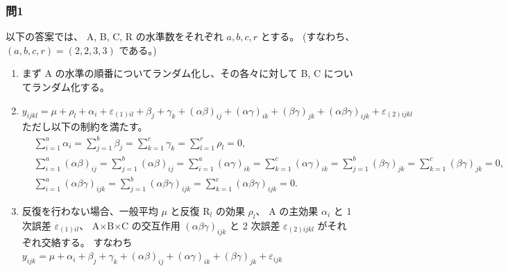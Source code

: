 \documentclass[./main.tex]{subfiles}
\begin{document}
    \subsubsection*{問1}
    以下の答案では、 A, B, C, R の水準数をそれぞれ $a, b, c, r$ とする。
    (すなわち、 $(a, b, c, r) = (2, 2, 3, 3)$ である。)

    \begin{enumerate}
        \item まず A の水準の順番についてランダム化し、その各々に対して B, C についてランダム化する。

        \item $y_{ijkl} = \mu + \rho_l + \alpha_i + \varepsilon_{(1)il}
                + \beta_j + \gamma_k + (\alpha\beta)_{ij} + (\alpha\gamma)_{ik} + (\beta\gamma)_{jk}
                + (\alpha\beta\gamma)_{ijk} + \varepsilon_{(2)ijkl}$\\
        ただし以下の制約を満たす。
        \begin{align*}
            &\sum_{i=1}^a \alpha_i = \sum_{j=1}^b \beta_j = \sum_{k=1}^c \gamma_k = \sum_{l=1}^r \rho_l = 0,\\
            &\sum_{i=1}^a (\alpha\beta)_{ij} = \sum_{j=1}^b (\alpha\beta)_{ij}
                = \sum_{i=1}^a (\alpha\gamma)_{ik} = \sum_{k=1}^c (\alpha\gamma)_{ik}
                = \sum_{j=1}^b (\beta\gamma)_{jk} = \sum_{k=1}^c (\beta\gamma)_{jk} = 0,\\
            &\sum_{i=1}^a (\alpha\beta\gamma)_{ijk}
                = \sum_{j=1}^b (\alpha\beta\gamma)_{ijk}
                = \sum_{k=1}^c (\alpha\beta\gamma)_{ijk}
                = 0.
        \end{align*}

        \item 反復を行わない場合、一般平均 $\mu$ と反復 $\mathrm{R}_l$ の効果 $\rho_l$、
        A の主効果 $\alpha_i$ と 1 次誤差 $\varepsilon_{(1)il}$、
        A$\times$B$\times$C の交互作用 $(\alpha\beta\gamma)_{ijk}$ と 2 次誤差 $\varepsilon_{(2)ijkl}$ がそれぞれ交絡する。
        すなわち\\
        $y_{ijk} = \mu + \alpha_i + \beta_j + \gamma_k + (\alpha\beta)_{ij} + (\alpha\gamma)_{ik} + (\beta\gamma)_{jk}
                + \varepsilon_{ijk}$
        

\end{enumerate}
\end{document}
